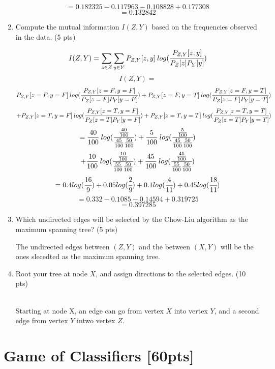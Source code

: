 \documentclass[a4paper]{article}
\theoremstyle{definition}
\newenvironment{soln}{
    \leavevmode\color{blue}\ignorespaces
}{}
\begin{document}
\begin{enumerate}
\begin{soln}
        \[  = 0.182325 - 0.117963 - 0.108828 + 0.177308\]
        \[  = 0.132842 \]
    \end{soln}
	\item Compute the mutual information $I(Z, Y)$ based on the frequencies observed in the data. (5 pts)
	\begin{soln}
        \[  I(Z, Y) = \sum_{z \in Z} \sum_{y \in Y} P_{Z,Y}[z, y]\:log(\cfrac{P_{Z,Y}[z, y]}{P_Z[z]P_Y[y]})  \]
        \[  I(Z, Y) = \]
        \[ P_{Z,Y}[z=F, y=F]\:log(\cfrac{P_{Z,Y}[z=F, y=F]}{P_Z[z=F]P_Y[y=F]}) + P_{Z,Y}[z=F, y=T]\:log(\cfrac{P_{Z,Y}[z=F, y=T]}{P_Z[z=F]P_Y[y=T]})\]
        \[  + P_{Z,Y}[z=T, y=F]\:log(\cfrac{P_{Z,Y}[z=T, y=F]}{P_Z[z=T]P_Y[y=F]}) + P_{Z,Y}[z=T, y=T]\:log(\cfrac{P_{Z,Y}[z=T, y=T]}{P_Z[z=T]P_Y[y=T]})\]
        \[  = \frac{40}{100}\:log(\cfrac{\frac{40}{100}}{\frac{45}{100}\frac{50}{100}}) + \frac{5}{100}\:log(\cfrac{\frac{5}{100}}{\frac{45}{100}\frac{50}{100}})\]
        \[  + \frac{10}{100}\:log(\cfrac{\frac{10}{100}}{\frac{55}{100}\frac{50}{100}}) + \frac{45}{100}\:log(\cfrac{\frac{45}{100}}{\frac{55}{100}\frac{50}{100}})\]
        \[  = 0.4log(\cfrac{16}{9}) + 0.05log(\cfrac{2}{9}) + 0.1log(\cfrac{4}{11}) + 0.45log(\cfrac{18}{11}) \]
        \[  = 0.332 - 0.1085 - 0.14594 +  0.319725\]
        \[  = 0.397285 \]
    \end{soln}
	\item Which undirected edges will be selected by the Chow-Liu algorithm as the maximum spanning tree? (5 pts)
	\begin{soln}
        The undirected edges between $(Z, Y)$ and the between $(X, Y)$ will be the ones slecedted as the maximum spanning tree.
    \end{soln}
	\item Root your tree at node $X$, and assign directions to the selected edges. (10 pts)
	\begin{soln}
        \\Starting at node X, an edge can go from vertex $X$ into vertex $Y$, and a second edge from vertex $Y$ intwo vertex $Z$.
    \end{soln}
\end{enumerate}

\section{Game of Classifiers [60pts]}
\end{document}
